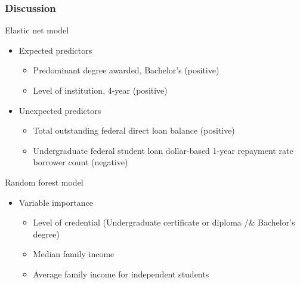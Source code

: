\documentclass[aspectratio=169, t, 10pt]{beamer}
\begin{document}
\begin{frame}
  \frametitle{Discussion}
  \begin{block}{Elastic net model}
    \begin{itemize}
    \item Expected predictors 
      \begin{itemize}
         \item Predominant degree awarded, Bachelor's (positive)
         \item Level of institution, 4-year (positive)
      \end{itemize}
    \item Unexpected predictors
       \begin{itemize}
         \item Total outstanding federal direct loan balance (positive)
         \item Undergraduate federal student loan dollar-based 1-year
           repayment rate borrower count (negative)
      \end{itemize}    
    \end{itemize}
  \end{block}
  \begin{block}{Random forest model}
    \begin{itemize}
    \item Variable importance
      \begin{itemize}
        \item Level of credential (Undergraduate certificate or
          diploma /& Bachelor's degree)
        \item Median family income
        \item Average family income for independent students
       \end{itemize}
    \end{itemize}
   \end{block}    
\end{frame}
 
\end{document}
